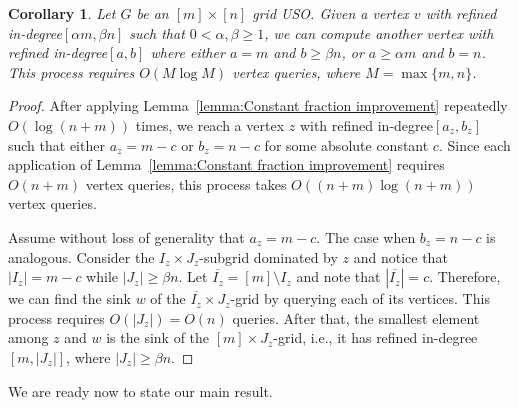 \documentclass[a4paper,10pt]{article}
\newtheorem{corollary}{Corollary}
\newcommand{\indegree}{refined in-degree\xspace}
\begin{document}
\begin{corollary}\label{corollary:Expansion to the wall}
Let $G$ be an $[m]\times[n]$ grid USO. 
Given a vertex $v$ with \indegree $[\alpha m, \beta n]$ such that $0 < \alpha, \beta \geq 1$, we can compute another vertex with \indegree $[a,b]$ where either $a = m$ and $b \geq \beta n$, or $a \geq \alpha m$ and $b  = n$. This process requires $O(M \log M)$ vertex queries, where $M = \max\{m,n\}$.
\end{corollary}
\begin{proof}
After applying Lemma~\ref{lemma:Constant fraction improvement} repeatedly $O(\log(n + m))$ times, we reach a vertex $z$ with \indegree $[a_z, b_z]$ such that either $a_z = m - c$ or $b_z = n- c$ for some absolute constant $c$. 
Since each application of Lemma~\ref{lemma:Constant fraction improvement} requires $O(n+m)$ vertex queries, this process takes $O((n + m) \log (n+m))$ vertex queries.

Assume without loss of generality that $a_z = m-c$. The case when $b_z = n-c$ is analogous. 
Consider the  $I_z\times J_z$-subgrid dominated by $z$ and 
notice that $|I_z| = m-c$ while $|J_z| \geq \beta n$. 
Let $\overline{I_z} = [m] \setminus I_z$ and note that $|\overline{I_z}| = c$. Therefore, we can find the sink $w$ of the $\overline{I_z}\times J_z$-grid by querying each of its vertices. This process requires $O(|J_z|) = O(n)$ queries.  After that, the smallest element among $z$ and $w$ is the sink of the $[m]\times J_z$-grid, i.e., it has \indegree $[m, |J_z|]$, where $|J_z|  \geq \beta n$.
\end{proof}

We are ready now to state our main result.
\end{document}
